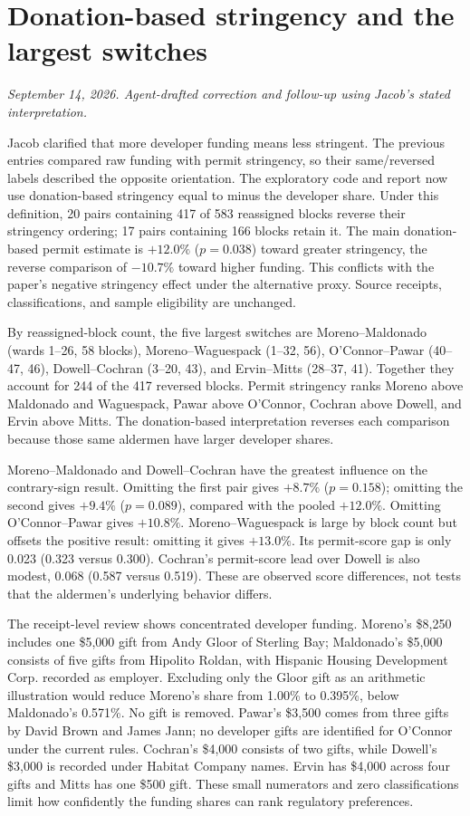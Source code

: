 \clearpage
\section*{Donation-based stringency and the largest switches}
\textit{September 14, 2026. Agent-drafted correction and follow-up using Jacob's stated interpretation.}

Jacob clarified that more developer funding means less stringent. The previous entries compared raw funding with permit stringency, so their same/reversed labels described the opposite orientation. The exploratory code and report now use donation-based stringency equal to minus the developer share. Under this definition, 20 pairs containing 417 of 583 reassigned blocks reverse their stringency ordering; 17 pairs containing 166 blocks retain it. The main donation-based permit estimate is $+12.0\%$ ($p=0.038$) toward greater stringency, the reverse comparison of $-10.7\%$ toward higher funding. This conflicts with the paper's negative stringency effect under the alternative proxy. Source receipts, classifications, and sample eligibility are unchanged.

By reassigned-block count, the five largest switches are Moreno--Maldonado (wards 1--26, 58 blocks), Moreno--Waguespack (1--32, 56), O'Connor--Pawar (40--47, 46), Dowell--Cochran (3--20, 43), and Ervin--Mitts (28--37, 41). Together they account for 244 of the 417 reversed blocks. Permit stringency ranks Moreno above Maldonado and Waguespack, Pawar above O'Connor, Cochran above Dowell, and Ervin above Mitts. The donation-based interpretation reverses each comparison because those same aldermen have larger developer shares.

Moreno--Maldonado and Dowell--Cochran have the greatest influence on the contrary-sign result. Omitting the first pair gives $+8.7\%$ ($p=0.158$); omitting the second gives $+9.4\%$ ($p=0.089$), compared with the pooled $+12.0\%$. Omitting O'Connor--Pawar gives $+10.8\%$. Moreno--Waguespack is large by block count but offsets the positive result: omitting it gives $+13.0\%$. Its permit-score gap is only 0.023 (0.323 versus 0.300). Cochran's permit-score lead over Dowell is also modest, 0.068 (0.587 versus 0.519). These are observed score differences, not tests that the aldermen's underlying behavior differs.

The receipt-level review shows concentrated developer funding. Moreno's \$8,250 includes one \$5,000 gift from Andy Gloor of Sterling Bay; Maldonado's \$5,000 consists of five gifts from Hipolito Roldan, with Hispanic Housing Development Corp. recorded as employer. Excluding only the Gloor gift as an arithmetic illustration would reduce Moreno's share from 1.00\% to 0.395\%, below Maldonado's 0.571\%. No gift is removed. Pawar's \$3,500 comes from three gifts by David Brown and James Jann; no developer gifts are identified for O'Connor under the current rules. Cochran's \$4,000 consists of two gifts, while Dowell's \$3,000 is recorded under Habitat Company names. Ervin has \$4,000 across four gifts and Mitts has one \$500 gift. These small numerators and zero classifications limit how confidently the funding shares can rank regulatory preferences.

